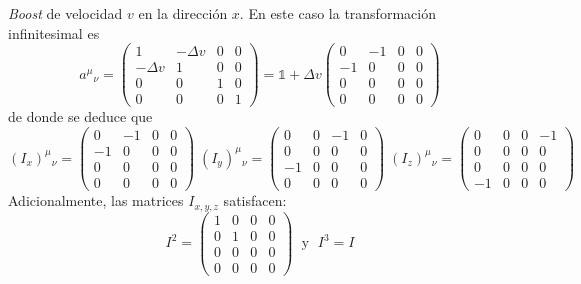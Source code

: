 \begin{example} \textit{Boost} de velocidad $v$ en la dirección $x$. En este caso la transformación infinitesimal es
	\begin{equation}\label{BoostInfX}
		a^{\mu}{}_{\nu}=	\begin{pmatrix}
							1 & -\Delta v & 0 & 0 \\
							-\Delta v & 1 & 0 & 0 \\
							0 & 0 & 1 & 0 \\
							0 & 0 & 0 & 1	
							\end{pmatrix}
		= \mathbb{1}+\Delta v 	\begin{pmatrix}
								0 & -1 & 0 & 0\\
								-1 & 0 & 0 & 0 \\
								0 & 0 & 0 & 0 \\
								0 & 0 & 0 & 0
								\end{pmatrix}
	\end{equation}
	de donde se deduce que
	\begin{equation}
	(I_x)^{\mu}{}_{\nu}=\begin{pmatrix}
								0 & -1 & 0 & 0\\
								-1 & 0 & 0 & 0 \\
								0 & 0 & 0 & 0 \\
								0 & 0 & 0 & 0
								\end{pmatrix}
	 \; (I_y)^{\mu}{}_{\nu}=\begin{pmatrix}
								0 & 0 & -1 & 0\\
								0 & 0 & 0 & 0 \\
								-1 & 0 & 0 & 0 \\
								0 & 0 & 0 & 0
								\end{pmatrix}
	 \;	
		(I_z)^{\mu}{}_{\nu}=\begin{pmatrix}
								0 & 0 & 0 & -1\\
								0 & 0 & 0 & 0 \\
								0 & 0 & 0 & 0 \\
								-1 & 0 & 0 & 0
								\end{pmatrix}
	\end{equation}
	Adicionalmente, las matrices $I_{x,y,z}$ satisfacen:
	\begin{equation}
	I^2=\begin{pmatrix} 1&0&0&0\\ 0&1&0&0\\ 0&0&0&0\\ 0&0&0&0 \end{pmatrix} \; \text{ y } \; I^3=I

\end{equation}
\end{example}
